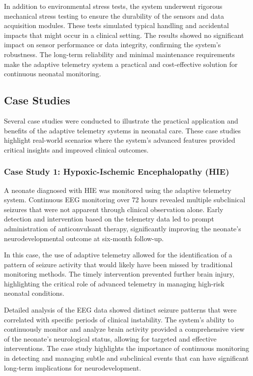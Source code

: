 \documentclass[12pt,journal,compsoc]{IEEEtran}
\begin{document}
In addition to environmental stress tests, the system underwent rigorous mechanical stress testing to ensure the durability of the sensors and data acquisition modules. These tests simulated typical handling and accidental impacts that might occur in a clinical setting. The results showed no significant impact on sensor performance or data integrity, confirming the system's robustness. The long-term reliability and minimal maintenance requirements make the adaptive telemetry system a practical and cost-effective solution for continuous neonatal monitoring.

\subsection{Case Studies}

Several case studies were conducted to illustrate the practical application and benefits of the adaptive telemetry systems in neonatal care. These case studies highlight real-world scenarios where the system's advanced features provided critical insights and improved clinical outcomes.

\subsubsection{Case Study 1: Hypoxic-Ischemic Encephalopathy (HIE)}

A neonate diagnosed with HIE was monitored using the adaptive telemetry system. Continuous EEG monitoring over 72 hours revealed multiple subclinical seizures that were not apparent through clinical observation alone. Early detection and intervention based on the telemetry data led to prompt administration of anticonvulsant therapy, significantly improving the neonate's neurodevelopmental outcome at six-month follow-up.

In this case, the use of adaptive telemetry allowed for the identification of a pattern of seizure activity that would likely have been missed by traditional monitoring methods. The timely intervention prevented further brain injury, highlighting the critical role of advanced telemetry in managing high-risk neonatal conditions.

Detailed analysis of the EEG data showed distinct seizure patterns that were correlated with specific periods of clinical instability. The system's ability to continuously monitor and analyze brain activity provided a comprehensive view of the neonate's neurological status, allowing for targeted and effective interventions. The case study highlights the importance of continuous monitoring in detecting and managing subtle and subclinical events that can have significant long-term implications for neurodevelopment.
\end{document}
